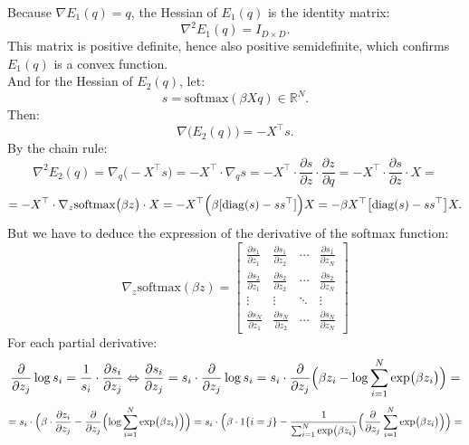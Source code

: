 \documentclass[12pt,a4paper]{article}
\begin{document}
        Because \(\nabla E_{1}(q) = q\), the Hessian of \(E_{1}(q)\) is the identity matrix:
        \[
            \nabla^{2} E_{1}(q) = I_{D\times D}.
        \]
        This matrix is positive definite, hence also positive semidefinite, which confirms \(E_{1}(q)\) is a convex function. \\
        And for the Hessian of \(E_{2}(q)\), let:
        \[
            s = \mathrm{softmax}(\beta X q) \in \mathbb{R}^{N}.
        \]
        Then:
        \[\nabla \bigl( E_{2}(q) \bigr) = -X^\top s.\]
        By the chain rule:
        \[
            \nabla^{2} E_{2}(q)
            = \nabla_{q} \bigl( -X^\top s \bigr)
            = -X^\top \cdot \nabla_{q} s
            = -X^\top \cdot \frac{\partial s}{\partial z} \cdot \frac{\partial z}{\partial q}
            = -X^\top \cdot \frac{\partial s}{\partial z} \cdot X =
        \]
        \[
            = -X^\top \cdot \nabla_{z} \mathrm{softmax} \bigl( \beta z \bigr) \cdot X
            = -X^\top \Bigl( \beta [\mathrm{diag}(s) - s s^\top] \Bigr) X
            = -\beta X^\top \bigl[\mathrm{diag}(s) - s s^\top \bigr] X.
        \]
        But we have to deduce the expression of the derivative of the softmax function:
        \[
            \nabla_{z} \mathrm{softmax}(\beta z) =
            \begin{bmatrix}
            \frac{\partial s_1}{\partial z_1} & \frac{\partial s_1}{\partial z_2} & \cdots & \frac{\partial s_1}{\partial z_N} \\
            \frac{\partial s_2}{\partial z_1} & \frac{\partial s_2}{\partial z_2} & \cdots & \frac{\partial s_2}{\partial z_N} \\
            \vdots & \vdots & \ddots & \vdots \\
            \frac{\partial s_N}{\partial z_1} & \frac{\partial s_N}{\partial z_2} & \cdots & \frac{\partial s_N}{\partial z_N}
            \end{bmatrix}
        \]
        For each partial derivative:
        \[
            \frac{\partial}{\partial z_j} \log s_i = \frac{1}{s_i} \cdot \frac{\partial s_i}{\partial z_j}
            \Leftrightarrow
            \frac{\partial s_i}{\partial z_j} = s_i \cdot \frac{\partial}{\partial z_j} \log s_i
            = s_i \cdot \frac{\partial}{\partial z_j} \Bigl(\beta z_i - \log \sum_{i=1}^N \exp \bigl( \beta z_{i} \bigr) \Bigr) =
        \]
        \[
            = s_i \cdot \Bigl( \beta \cdot \frac{\partial z_i}{\partial z_j} - \frac{\partial}{\partial z_j} \Bigl( \log \sum_{i=1}^N \exp \bigl( \beta z_{i} \bigr) \Bigr) \Bigr)
            = s_i \cdot \Bigl( \beta \cdot 1\{i=j\} - \frac{1}{\sum_{i=1}^N \exp \bigl( \beta z_{i} \bigr)} \Bigl( \frac{\partial}{\partial z_j} \sum_{i=1}^N \exp \bigl( \beta z_{i} \bigr) \Bigr) \Bigr) =
        \]
\end{document}
